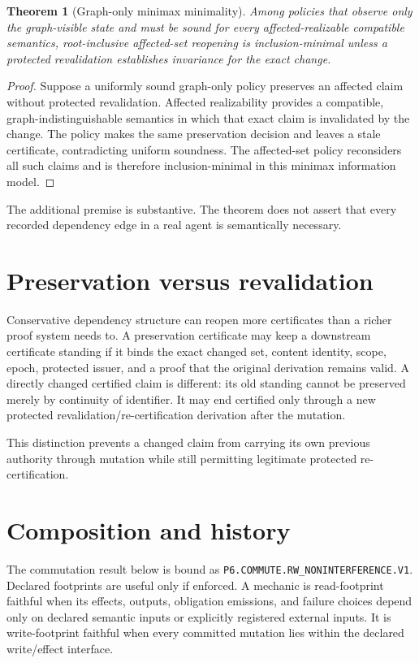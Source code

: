 \documentclass[11pt]{article}
\newtheorem{theorem}{Theorem}
\begin{document}
\begin{theorem}[Graph-only minimax minimality]
Among policies that observe only the graph-visible state and must be sound for every affected-realizable compatible semantics, root-inclusive affected-set reopening is inclusion-minimal unless a protected revalidation establishes invariance for the exact change.
\end{theorem}
\begin{proof}
Suppose a uniformly sound graph-only policy preserves an affected claim without protected revalidation. Affected realizability provides a compatible, graph-indistinguishable semantics in which that exact claim is invalidated by the change. The policy makes the same preservation decision and leaves a stale certificate, contradicting uniform soundness. The affected-set policy reconsiders all such claims and is therefore inclusion-minimal in this minimax information model.
\end{proof}

The additional premise is substantive. The theorem does not assert that every recorded dependency edge in a real agent is semantically necessary.

\section{Preservation versus revalidation}
Conservative dependency structure can reopen more certificates than a richer proof system needs to. A preservation certificate may keep a downstream certificate standing if it binds the exact changed set, content identity, scope, epoch, protected issuer, and a proof that the original derivation remains valid. A directly changed certified claim is different: its old standing cannot be preserved merely by continuity of identifier. It may end certified only through a new protected revalidation\slash re-certification derivation after the mutation.

This distinction prevents a changed claim from carrying its own previous authority through mutation while still permitting legitimate protected re-certification.

\section{Composition and history}
The commutation result below is bound as
\texttt{P6.COMMUTE.RW\_NONINTERFERENCE.V1}.
Declared footprints are useful only if enforced. A mechanic is read-footprint faithful when its effects, outputs, obligation emissions, and failure choices depend only on declared semantic inputs or explicitly registered external inputs. It is write-footprint faithful when every committed mutation lies within the declared write/effect interface.
\end{document}
